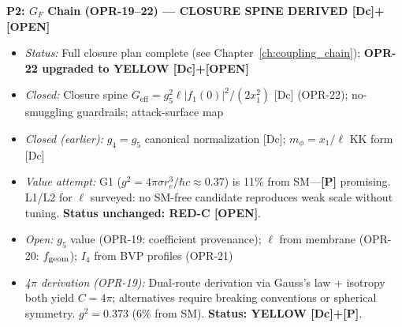 \begin{tcolorbox}[breakable, enhanced, colback=blue!5, colframe=blue!60!black,
    title=\textbf{OPR Closure Plan: Prioritized Research Program}, width=\linewidth]
\textbf{P2: $G_F$ Chain (OPR-19--22) --- CLOSURE SPINE DERIVED [Dc]+[OPEN]}
\begin{itemize}[nosep]
    \item \emph{Status:} Full closure plan complete (see Chapter~\ref{ch:coupling_chain}); \textbf{OPR-22 upgraded to YELLOW [Dc]+[OPEN]}
    \item \emph{Closed:} Closure spine $G_{\text{eff}} = g_5^2 \ell |f_1(0)|^2 / (2x_1^2)$ [Dc] (OPR-22); no-smuggling guardrails; attack-surface map
    \item \emph{Closed (earlier):} $g_4 = g_5$ canonical normalization [Dc]; $m_\phi = x_1/\ell$ KK form [Dc]
    \item \emph{Value attempt:} G1 ($g^2 = 4\pi\sigma r_e^3/\hbar c \approx 0.37$) is 11\% from SM---\textbf{[P]} promising.
          L1/L2 for $\ell$ surveyed: no SM-free candidate reproduces weak scale without tuning. \textbf{Status unchanged: RED-C [OPEN]}.
    \item \emph{Open:} $g_5$ value (OPR-19: coefficient provenance); $\ell$ from membrane (OPR-20: $f_{\rm geom}$); $I_4$ from BVP profiles (OPR-21)
    \item \emph{4$\pi$ derivation (OPR-19):} Dual-route derivation via Gauss's law + isotropy both yield $C = 4\pi$; alternatives require breaking conventions or spherical symmetry. $g^2 = 0.373$ (6\% from SM). \textbf{Status: YELLOW [Dc]+[P]}.

\end{itemize}
\end{tcolorbox}
